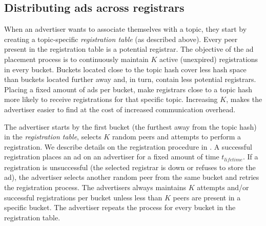 
\subsection{Distributing ads across registrars}\label{sec:registration_multi}
When an advertiser wants to associate themselves with a topic, they start by creating a topic-specific \emph{registration table} (as described above). 
Every peer present in the registration table is a potential registrar. 
The objective of the ad placement process is to continuously maintain $K$ active (\ie unexpired) registrations in every bucket. 
Buckets located close to the topic hash cover less hash space than buckets located further away and, in turn, contain less potential registrars. 
Placing a fixed amount of ads per bucket, make registrars close to a topic hash more likely to receive registrations for that specific topic. 
Increasing $K$, makes the advertiser easier to find at the cost of increased communication overhead. 


The advertiser starts by the first bucket (the furthest away from the topic hash) in the \emph{registration table}, selects $K$ random peers and attempts to perform a registration. 
We describe details on the registration procedure in . 
A successful registration places an ad on an advertiser for a fixed amount of time $t_\textit{lifetime}$.
If a registration is unsuccessful (the selected registrar is down or refuses to store the ad), the advertiser selects another random peer from the same bucket and retries the registration process. 
The advertisers always maintains $K$ attempts and/or successful registrations per bucket unless less than $K$ peers are present in a specific bucket. 
The advertiser repeats the process for every bucket in the registration table. 

